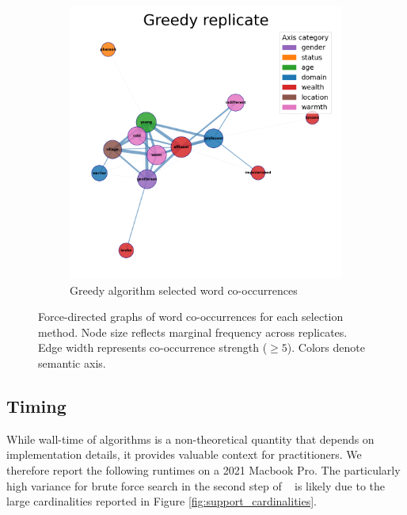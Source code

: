 \begin{figure}[h]
\begin{subfigure}[b]{0.47\textwidth}
        \includegraphics[width=\textwidth]{../figures/greedy_graph.png}
        \caption{Greedy algorithm selected word co-occurrences}
        \label{fig:co_occurrence_two_stage}
    \end{subfigure}
    
    \caption{Force-directed graphs of word co-occurrences for each selection method.
    Node size reflects marginal frequency across replicates.
    Edge width represents co-occurrence strength ($\geq 5$).
    Colors denote semantic axis.}
    \label{fig:co_occurrence_graphs}
\end{figure}




\subsection{Timing}
\label{sec:timing}

While wall-time of algorithms is a non-theoretical quantity that depends on implementation details, it provides valuable context for practitioners.
We therefore report the following runtimes on a 2021 Macbook Pro.
The particularly high variance for brute force search in the second step of \tsip~ is likely due to the large cardinalities reported in Figure \ref{fig:support_cardinalities}.

